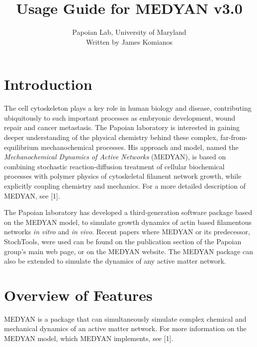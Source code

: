 \documentclass[11pt, oneside]{article}   	%
\title{Usage Guide for MEDYAN v3.0}
\author{Papoian Lab, University of Maryland \\ Written by James Komianos}
\date{}							%
\begin{document}
\maketitle



\tableofcontents

\newpage
\section {Introduction}

 The cell cytoskeleton plays a key role in human biology and disease, contributing ubiquitously
 to such important processes as embryonic development, wound repair and cancer 
 metastasis. The Papoian laboratory is interested in gaining deeper understanding of the
 physical chemistry behind these complex, far-from-equilibrium mechanochemical 
 processes. His approach and model, named the \textit{Mechanochemical Dynamics of Active Networks} 
 (MEDYAN), is based on combining stochastic reaction-diffusion treatment
 of cellular biochemical processes with polymer physics of cytoskeletal filament network 
 growth, while explicitly coupling chemistry and mechanics. For a more detailed description of MEDYAN, see [1].
 
 The Papoian laboratory has developed a third-generation software package based on the MEDYAN
 model, to simulate growth dynamics of actin based filamentous networks \textit{in vitro} and 
 \textit{in vivo}. Recent papers where MEDYAN or its predecessor, StochTools, were used 
 can be found on the publication section of the Papoian group's main web page, or on the MEDYAN website. 
 The MEDYAN package can also be extended to simulate the dynamics of any active matter network.

\section {Overview of Features}

MEDYAN is a package that can simultaneously simulate complex chemical and mechanical dynamics
of an active matter network. For more information on the MEDYAN model, which MEDYAN implements,
see [1].
\end{document}
